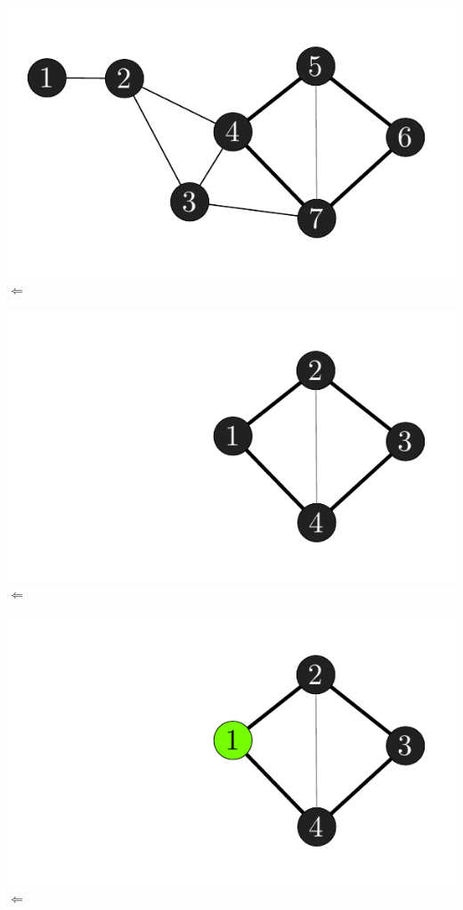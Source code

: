 \documentclass[xcolor=x11names,compress]{beamer}
\begin{document}
\begin{frame}
\begin{overprint}
		\includegraphics[scale=1.0]{img/graph/nodes/01.pdf}
		\onslide<12>
		\( \Leftarrow \)

		\includegraphics[scale=1.0]{img/graph/nodes/02.pdf}
		\onslide<13>
		\( \Leftarrow \)

		\includegraphics[scale=1.0]{img/graph/nodes/03.pdf}
		\onslide<14>
		\( \Leftarrow \)


\end{overprint}
\end{frame}
\end{document}
